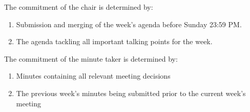 The commitment of the chair is determined by:
\begin{enumerate}
    \item Submission and merging of the week’s agenda before Sunday 23:59 PM.
    \item The agenda tackling all important talking points for the week.
\end{enumerate}
The commitment of the minute taker is determined by:
\begin{enumerate}
    \item Minutes containing all relevant meeting decisions
    \item The previous week’s minutes being submitted prior to the current week’s meeting
\end{enumerate}
\par